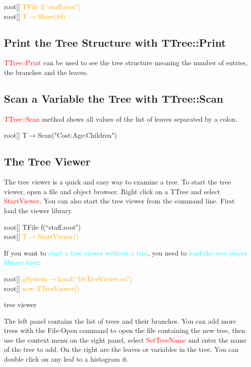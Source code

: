 \documentclass[12pt,a4paper]{article}
\begin{document}
root[] \textcolor{orange}{TFile f(``staff.root")} \\
root[] \textcolor{orange}{T$\rightarrow$Show(10)}

\subsection{Print the Tree Structure with TTree::Print}

\textcolor{red}{TTree::Print} can be used to see the tree structure meaning the number of entries, the branches and the leaves. 

\subsection{Scan a Variable the Tree with TTree::Scan}

\textcolor{red}{TTree::Scan} method shows all values of the list of leaves separated by a colon.

root[] T$\rightarrow$Scan("Cost:Age:Children")


\subsection{The Tree Viewer}
The tree viewer is a quick and easy way to examine a tree. To start the tree viewer, open a file and object browser. Right click on a TTree and select \textcolor{red}{StartViewer}. You can also start the tree viewer from the command line. First load the viewer library.

root[] TFile f(``staff.root") \\
root[] \textcolor{orange}{T$\rightarrow$StartViewer()}

If you want to \textcolor{cyan}{start a tree viewer without a tree}, you need to \textcolor{cyan}{load the tree player library first}:

root[] \textcolor{orange}{gSystem$\rightarrow$Load(``libTreeViewer.so")} \\
root[] \textcolor{orange}{new TTreeViewer()}

tree viewer

The left panel contains the list of trees and their branches. You can add more trees with the File-Open command to open the file containing the new tree, then use the context menu on the right panel, select \textcolor{red}{SetTreeName} and enter the name of the tree to add. On the right are the leaves or variables in the tree. You can double click on any leaf to a histogram it.
\end{document}
